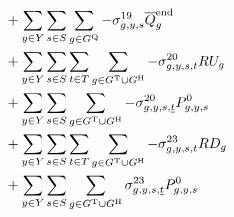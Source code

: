 \documentclass{article}
\begin{document}
\begin{align}
& + \sum\limits_{\iYear \in \sYears}\sum\limits_{\iScenario \in \sScenarios} \sum\limits_{\iGenerator \in \sStorage} - \dMaxStorageEnergyIntervalEnd \cStorageUnitEnergyIntervalEndMax\\
%
& + \sum\limits_{\iYear \in \sYears}\sum\limits_{\iScenario \in \sScenarios}\sum\limits_{\iInterval \in \sIntervals} \sum\limits_{\iGenerator \in \sGeneratorsThermal \cup \sGeneratorsHydro} - \dRampRateUp \cRampRateUp\\
& + \sum\limits_{\iYear \in \sYears}\sum\limits_{\iScenario \in \sScenarios} \sum\limits_{\iGenerator \in \sGeneratorsThermal \cup \sGeneratorsHydro} - \dRampRateUp[\iGenerator,\iYear,\iScenario,\iIntervalStart] \cPowerInitial\\
%
%
& + \sum\limits_{\iYear \in \sYears}\sum\limits_{\iScenario \in \sScenarios}\sum\limits_{\iInterval \in \sIntervals} \sum\limits_{\iGenerator \in \sGeneratorsThermal \cup \sGeneratorsHydro} - \dRampRateDown \cRampRateDown\\
& + \sum\limits_{\iYear \in \sYears}\sum\limits_{\iScenario \in \sScenarios} \sum\limits_{\iGenerator \in \sGeneratorsThermal \cup \sGeneratorsHydro} \dRampRateDown[\iGenerator,\iYear,\iScenario,\iIntervalStart] \cPowerInitial\\
%

\end{align}
\end{document}
